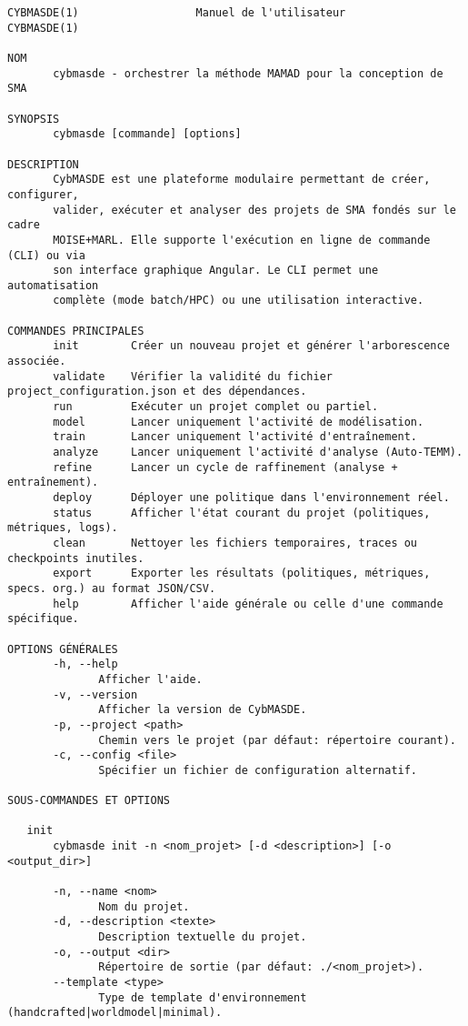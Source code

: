 \begin{verbatim}
CYBMASDE(1)                  Manuel de l'utilisateur                  CYBMASDE(1)

NOM
       cybmasde - orchestrer la méthode MAMAD pour la conception de SMA

SYNOPSIS
       cybmasde [commande] [options]

DESCRIPTION
       CybMASDE est une plateforme modulaire permettant de créer, configurer,
       valider, exécuter et analyser des projets de SMA fondés sur le cadre
       MOISE+MARL. Elle supporte l'exécution en ligne de commande (CLI) ou via
       son interface graphique Angular. Le CLI permet une automatisation
       complète (mode batch/HPC) ou une utilisation interactive.

COMMANDES PRINCIPALES
       init        Créer un nouveau projet et générer l'arborescence associée.
       validate    Vérifier la validité du fichier project_configuration.json et des dépendances.
       run         Exécuter un projet complet ou partiel.
       model       Lancer uniquement l'activité de modélisation.
       train       Lancer uniquement l'activité d'entraînement.
       analyze     Lancer uniquement l'activité d'analyse (Auto-TEMM).
       refine      Lancer un cycle de raffinement (analyse + entraînement).
       deploy      Déployer une politique dans l'environnement réel.
       status      Afficher l'état courant du projet (politiques, métriques, logs).
       clean       Nettoyer les fichiers temporaires, traces ou checkpoints inutiles.
       export      Exporter les résultats (politiques, métriques, specs. org.) au format JSON/CSV.
       help        Afficher l'aide générale ou celle d'une commande spécifique.

OPTIONS GÉNÉRALES
       -h, --help
              Afficher l'aide.
       -v, --version
              Afficher la version de CybMASDE.
       -p, --project <path>
              Chemin vers le projet (par défaut: répertoire courant).
       -c, --config <file>
              Spécifier un fichier de configuration alternatif.

SOUS-COMMANDES ET OPTIONS

   init
       cybmasde init -n <nom_projet> [-d <description>] [-o <output_dir>]

       -n, --name <nom>
              Nom du projet.
       -d, --description <texte>
              Description textuelle du projet.
       -o, --output <dir>
              Répertoire de sortie (par défaut: ./<nom_projet>).
       --template <type>
              Type de template d'environnement (handcrafted|worldmodel|minimal).


\end{verbatim}
